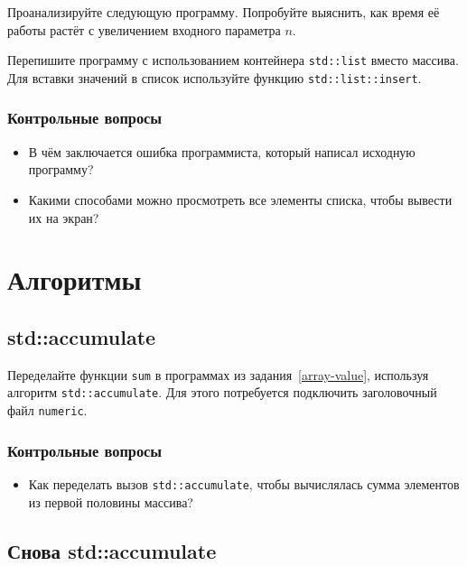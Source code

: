\documentclass[10pt,twoside,openany]{book}
\begin{document}
Проанализируйте следующую программу. Попробуйте выяснить, как время её работы растёт
с увеличением входного параметра $n$.



Перепишите программу с использованием контейнера {\tt std::list} вместо массива.
Для вставки значений в список используйте функцию {\tt std::list::insert}.

\subsection*{Контрольные вопросы}

\begin{itemize}
    \item В чём заключается ошибка программиста, который написал исходную программу?
    \item Какими способами можно просмотреть все элементы списка, чтобы вывести их на экран?
\end{itemize}


\chapter{Алгоритмы}

\section{std::accumulate}

Переделайте функции {\tt sum} в программах из задания~\ref{array-value},
используя алгоритм {\tt std::accumulate}.
Для этого потребуется подключить заголовочный файл {\tt numeric}.

\subsection*{Контрольные вопросы}

\begin{itemize}
    \item Как переделать вызов {\tt std::accumulate}, чтобы вычислялась сумма элементов
          из первой половины массива?
\end{itemize}

\section{Снова std::accumulate}
\end{document}
